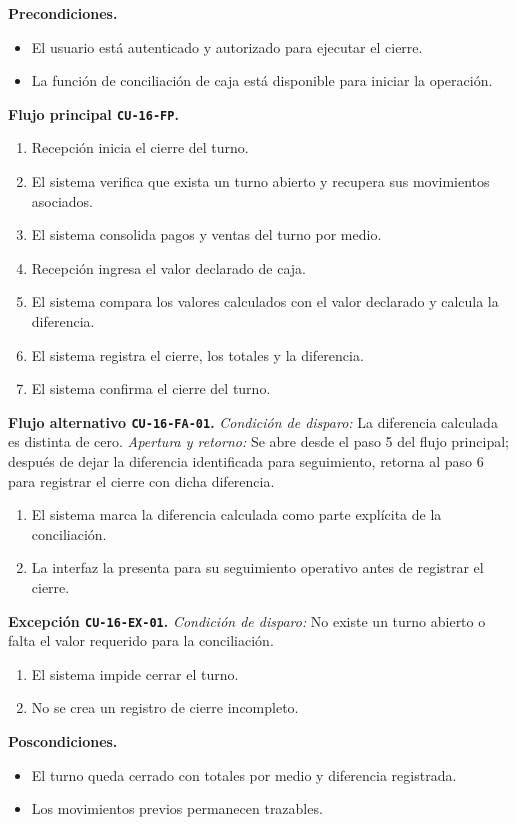 \documentclass[11pt,a4paper,twoside]{article}
\begin{document}
\textbf{Precondiciones.}
\begin{itemize}
\item El usuario está autenticado y autorizado para ejecutar el cierre.
\item La función de conciliación de caja está disponible para iniciar la operación.
\end{itemize}

\textbf{Flujo principal \texttt{CU-16-FP}.}
\begin{enumerate}
\item Recepción inicia el cierre del turno.
\item El sistema verifica que exista un turno abierto y recupera sus movimientos asociados.
\item El sistema consolida pagos y ventas del turno por medio.
\item Recepción ingresa el valor declarado de caja.
\item El sistema compara los valores calculados con el valor declarado y calcula la diferencia.
\item El sistema registra el cierre, los totales y la diferencia.
\item El sistema confirma el cierre del turno.
\end{enumerate}

\textbf{Flujo alternativo \texttt{CU-16-FA-01}.} \textit{Condición de disparo:} La diferencia calculada es distinta de cero. \textit{Apertura y retorno:} Se abre desde el paso 5 del flujo principal; después de dejar la diferencia identificada para seguimiento, retorna al paso 6 para registrar el cierre con dicha diferencia.
\begin{enumerate}[label=\alph*.]
\item El sistema marca la diferencia calculada como parte explícita de la conciliación.
\item La interfaz la presenta para su seguimiento operativo antes de registrar el cierre.
\end{enumerate}

\textbf{Excepción \texttt{CU-16-EX-01}.} \textit{Condición de disparo:} No existe un turno abierto o falta el valor requerido para la conciliación.
\begin{enumerate}[label=\alph*.]
\item El sistema impide cerrar el turno.
\item No se crea un registro de cierre incompleto.
\end{enumerate}

\textbf{Poscondiciones.}
\begin{itemize}
\item El turno queda cerrado con totales por medio y diferencia registrada.
\item Los movimientos previos permanecen trazables.
\end{itemize}
\end{document}
